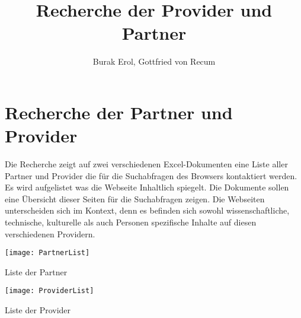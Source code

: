 
\title{Recherche der Provider und Partner}
\author{Burak Erol, Gottfried von Recum}


\chapter{Recherche der Partner und Provider}

Die Recherche zeigt auf zwei verschiedenen Excel-Dokumenten eine Liste aller Partner und Provider die für die Suchabfragen des Browsers kontaktiert werden. Es wird aufgelistet was die Webseite Inhaltlich spiegelt. Die Dokumente sollen eine Übersicht dieser Seiten für die Suchabfragen zeigen. Die Webseiten unterscheiden sich im Kontext, denn es befinden sich sowohl wissenschaftliche, technische, kulturelle als auch Personen spezifische Inhalte auf diesen verschiedenen Providern.

\begin{table}[h]
	\centering
	\texttt{[image: PartnerList]}
	\caption{Liste der Partner}
	\label{fig:Partner}
\end{table}

\begin{table}[h]
	\centering
	\texttt{[image: ProviderList]}
	\caption{Liste der Provider}
	\label{fig:Provider}
\end{table}